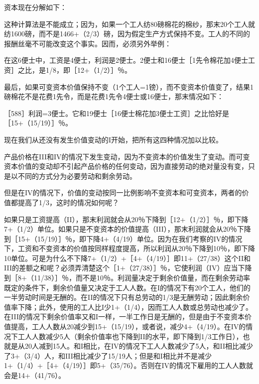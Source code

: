 资本现在分解如下：

\todo{}

这种计算法是不能成立；因为，如果一个工人纺80磅棉花的棉纱，那末20个工人就纺1600磅，而不是1466+（2/3）磅，因为假定生产方式保持不变。工人的不同的报酬丝毫不可能改变这个事实。因而，必须另外举例：

\todo{}

在这6便士中，工资是4便士，利润是2便士。2便士和16便士［1先令棉花加4便士工资］之比，是1/8，即［12+（1/2）］％。

最后，如果可变资本价值保持不变（1个工人=1镑），而不变资本价值变了，结果1磅棉花不是花费1先令，而是花费1先令4便士或16便士，那末情况如下：

\todo{}

［588］利润=3便士。它和19便士［16便士棉花加3便士工资］之比恰好是［15+（15/19）］％。

现在我们从还没有发生价值变动的I开始，把所有这四种情况加以比较。

\todo{}

产品价格在III和IV的情况下发生变动，因为不变资本的价值发生了变动。而可变资本价值的变动却不引起产品价格的任何变动，因为直接劳动的绝对量没有变，只是以不同的方式分为必要劳动和剩余劳动。

但是在IV的情况下，价值的变动按同一比例影响不变资本和可变资本，两者的价值都提高了1/3，这时的情况如何呢？

如果只是工资提高（II），那末利润就会从20％下降到［12+（1/2）］％，即下降7+（1/2）单位。如果只是不变资本的价值提高（III），那末利润就会从20％下降到［15+（15/19）］％，即下降4+（4/19）单位。因为在我们考察的IV的情况下，工资和不变资本的价值按同样程度提高，所以利润从20％下降到10％，即下降10单位。可是为什么不下降7+（1/2）+［4+（4/19）］即11+（27/38）这个II和III的差额之和呢？必须弄清楚这个［1+（27/38）］％，它使利润（IV）应当下降到［8+（11/38）］％，而不是10％。利润量决定于剩余价值量，而在剩余劳动率既定的条件下，剩余价值量又决定于工人人数。在I的情况下有20个工人，他们的一半劳动时间是无酬的。在II的情况下只有总劳动的1/3是无酬劳动；因此剩余价值率下降；此外，使用的工人比I少1+（1/4），因而工人人数或总劳动也减少了。在III的情况下剩余价值率又和I一样，一半工作日是无酬的，但是由于不变资本价值提高，工人人数从20减少到15+（15/19），或者说，减少4+（4/19）。在IV的情况下工人人数减少5人（剩余价值率也下降到II的水平，即下降到1/3工作日），也就是从20人减到15人。和I相比，在IV的情况下工人人数减少了5人，和II相比减少了3+（3/4）人，和III相比减少了15/19人；但是和I相比并不是减少1+（1/4）+［4+（4/19）］即5+（35/76）。否则在IV的情况下雇用的工人人数就会是14+（41/76）。

